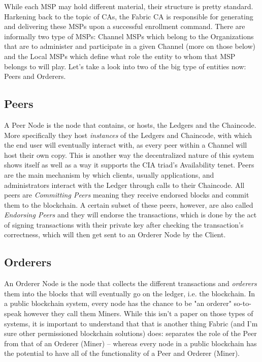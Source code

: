 		
		
		\hspace{10mm}While each MSP may hold different material, their structure is pretty standard. Harkening back to the topic of CAs, the Fabric CA is responsible for generating and delivering these MSPs upon a successful enrollment command. There are informally two type of MSPs: Channel MSPs which belong to the Organizations that are to administer and participate in a given Channel (more on those below) and the Local MSPs which define what role the entity to whom that MSP belongs to will play. Let's take a look into two of the big type of entities now: Peers and Orderers.\\
		
	\subsection{Peers}
		\hspace{10mm}A Peer Node is the node that contains, or hosts, the Ledgers and the Chaincode. More specifically they host \textit{instances} of the Ledgers and Chaincode, with which the end user will eventually interact with, as every peer within a Channel will host their own copy. This is another way the decentralized nature of this system shows itself as well as a way it supports the CIA triad's Availability tenet. Peers are the main mechanism by which clients, usually applications, and administrators interact with the Ledger through calls to their Chaincode. All peers are \textit{Committing Peers} meaning they receive endorsed blocks and commit them to the blockchain. A certain subset of these peers, however, are also called \textit{Endorsing Peers} and they will endorse the transactions, which is done by the act of signing transactions with their private key after checking the transaction's correctness, which will then get sent to an Orderer Node by the Client.\\	
		
	\subsection{Orderers}
		\hspace{10mm}An Orderer Node is the node that collects the different transactions and \textit{orderers} them into the blocks that will eventually go on the ledger, i.e. the blockchain. In a public blockchain system, every node has the chance to be "an orderer" so-to-speak however they call them Miners. While this isn't a paper on those types of systems, it is important to understand that that is another thing Fabric (and I'm sure other permissioned blockchain solutions) does: separates the role of the Peer from that of an Orderer (Miner) -- whereas every node in a public blockchain has the potential to have all of the functionality of a Peer and Orderer (Miner).\\
		
